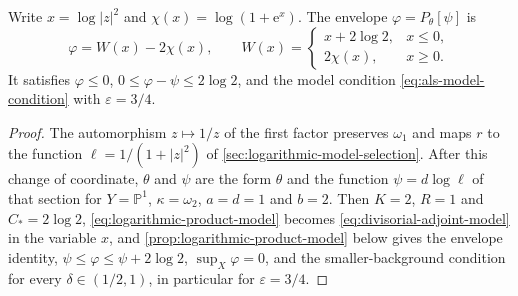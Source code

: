 \begin{lemma}\label{lem:divisorial-adjoint-model}
Write $x=\log|z|^2$ and $\chi(x)=\log(1+\mathrm e^x)$. The envelope $\varphi=P_\theta[\psi]$ is
\begin{equation}\label{eq:divisorial-adjoint-model}
 \varphi=W(x)-2\chi(x),\qquad
 W(x)=\begin{cases}x+2\log2,&x\leq0,\\2\chi(x),&x\geq0.\end{cases}
\end{equation}
It satisfies $\varphi\leq0$, $0\leq\varphi-\psi\leq2\log2$, and the model condition \eqref{eq:als-model-condition} with $\varepsilon=3/4$.
\end{lemma}
\begin{proof}
The automorphism $z\mapsto1/z$ of the first factor preserves $\omega_1$ and maps $r$ to the function $\ell=1/(1+|z|^2)$ of \cref{sec:logarithmic-model-selection}. After this change of coordinate, $\theta$ and $\psi$ are the form $\theta$ and the function $\psi=d\log\ell$ of that section for $Y=\mathbb P^1$, $\kappa=\omega_2$, $a=d=1$ and $b=2$. Then $K=2$, $R=1$ and $C_*=2\log2$, \eqref{eq:logarithmic-product-model} becomes \eqref{eq:divisorial-adjoint-model} in the variable $x$, and \cref{prop:logarithmic-product-model} below gives the envelope identity, $\psi\leq\varphi\leq\psi+2\log2$, $\sup_X\varphi=0$, and the smaller-background condition for every $\delta\in(1/2,1)$, in particular for $\varepsilon=3/4$.
\end{proof}

